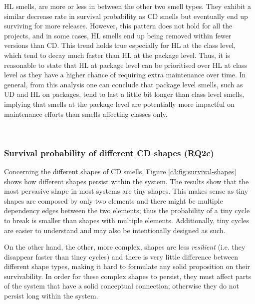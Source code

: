 HL smells, are more or less in between the other two smell types. They exhibit a similar decrease rate in survival probability as CD smells but eventually end up surviving for more releases. However, this pattern does not hold for all the projects, and in some cases, HL smells end up being removed within fewer versions than CD.
This trend holds true especially for HL at the class level, which tend to decay much faster than HL at the package level.
Thus, it is reasonable to state that HL at package level can be prioritised over HL at class level as they have a higher chance of requiring extra maintenance over time.
In general, from this analysis one can conclude that package level smells, such as UD and HL on packages, tend to last a little bit longer than class level smells, implying that smells at the package level are potentially more impactful on maintenance efforts than smells affecting classes only.

\\
\subsubsection{Survival probability of different CD shapes (RQ2c)}
Concerning the different shapes of CD smells, Figure \ref{c3:fig:survival-shapes} shows how different shapes persist within the system.
The results show that the most pervasive shape in most systems are tiny shapes. This makes sense as tiny shapes are composed by only two elements and there might be multiple dependency edges between the two elements; thus the probability of a tiny cycle to break is smaller than shapes with multiple elements.
Additionally, tiny cycles are easier to understand and may also be intentionally designed as such.

On the other hand, the other, more complex, shapes are less \emph{resilient} (i.e. they disappear faster than tincy cycles) and there is very little difference between different shape types, making it hard to formulate any solid proposition on their survivability. In order for these complex shapes to persist, they must affect parts of the system that have a solid conceptual connection; otherwise they do not persist long within the system.

